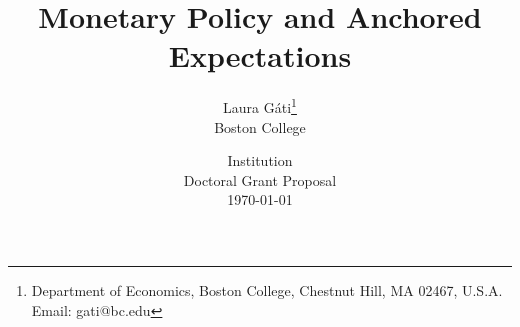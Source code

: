 \documentclass[11pt]{article}
\renewcommand{\[}{\begin{equation}}
\renewcommand{\]}{\end{equation}}
\begin{document}
\linespread{1.0}

\title{Monetary Policy and Anchored Expectations}
\author{Laura G\'ati\thanks{%
Department of Economics, Boston College, Chestnut Hill, MA 02467, U.S.A. Email: gati@bc.edu} \\
 Boston College \\
}
\date{Institution \\
 Doctoral Grant Proposal \\
 \today}
\maketitle







\end{document}

